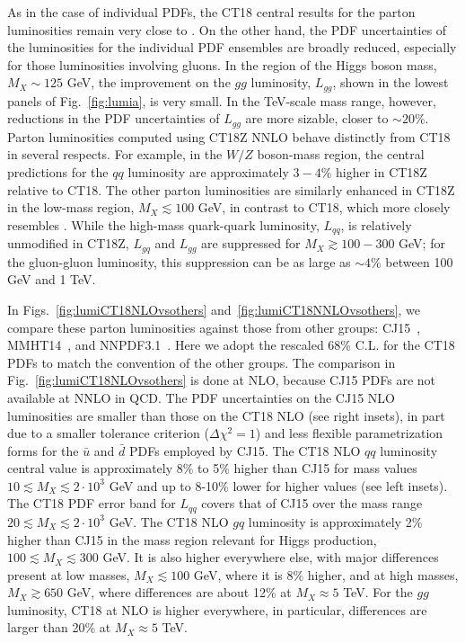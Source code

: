 As in the case of individual PDFs, the CT18 central results for the parton
luminosities remain very close to \CTHERAII. On the other hand, the
PDF uncertainties of the luminosities for the individual PDF ensembles
are broadly reduced, especially for those 
luminosities involving gluons. In the region of the Higgs 
boson mass, $M_X\! \sim\! 125$ GeV, the improvement on the $gg$ luminosity, $L_\mathit{gg}$, shown
in the lowest panels of Fig.~\ref{fig:lumia}, is very small.
In the TeV-scale mass range, however, reductions in the PDF uncertainties of $L_\mathit{gg}$ are
more sizable, closer to $\sim\!20\%$.
%
Parton luminosities computed using CT18Z NNLO behave distinctly from CT18 in several respects. For example, in the
$W/Z$ boson-mass region, the central predictions for the $qq$ luminosity are approximately $3\!-\!4\%$
higher in CT18Z relative to CT18. The other parton luminosities are similarly enhanced in CT18Z
in the low-mass region, $M_X\! \lesssim\! 100$ GeV, in contrast to CT18, which more closely
resembles \CTHERAII.
%
While the high-mass quark-quark luminosity, $L_{qq}$, is relatively unmodified in CT18Z, 
$L_{gq}$ and $L_{gg}$ are suppressed for $M_X\! \gtrsim\! 100\!-\!300$ GeV; for the
gluon-gluon luminosity, this suppression can be as large as $\sim\!4\%$
between 100 GeV and 1 TeV. 

In Figs.~\ref{fig:lumiCT18NLOvsothers}
and~\ref{fig:lumiCT18NNLOvsothers}, we compare these
parton luminosities against those from other groups:
CJ15~\cite{Accardi:2016qay}, MMHT14~\cite{Harland-Lang:2014zoa}, and
NNPDF3.1~\cite{Ball:2017nwa}. Here we adopt the rescaled 68\% C.L. for
the CT18 PDFs to match the convention of the other groups. 
The comparison in Fig.~\ref{fig:lumiCT18NLOvsothers} is done at NLO, 
because CJ15 PDFs are not available at NNLO in QCD. 
The PDF uncertainties on the CJ15 NLO luminosities
are smaller than those on the CT18 NLO (see right insets), in part 
due to a smaller tolerance criterion ($\Delta \chi^2 =1$) and less
flexible parametrization forms for the $\bar u$ and $\bar d$ PDFs
employed by CJ15.
The CT18 NLO $qq$ luminosity central value is approximately 8\% to 5\% higher than CJ15 for mass 
values $10\lesssim M_{X}\lesssim 2\cdot  10^{3}$ GeV and up to 8-10\% lower for higher values (see left insets). 
The CT18 PDF error band for $L_{qq}$ covers that of CJ15  over the mass range $20\lesssim M_{X}\lesssim 2\cdot  10^{3}$ GeV. 
The CT18 NLO $gq$ luminosity is approximately 2\% higher than CJ15 in
the mass region relevant for Higgs production,
$100\lesssim M_{X}\lesssim 300$ GeV. It is also higher everywhere
else,  
with major differences present
at low masses, $M_X\lesssim 100$ GeV, where it is 8\% higher,
and at high masses, $M_X \gtrsim 650$ GeV, where differences are about 12\% at $M_X \approx 5$ TeV. 
For the $gg$ luminosity, CT18 at NLO is higher everywhere, in particular, differences are larger than 20\% at $M_X \approx 5$ TeV.

